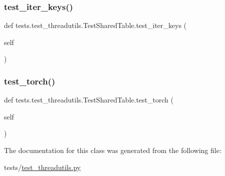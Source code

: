 \subsubsection{\texorpdfstring{test\+\_\+iter\+\_\+keys()}{test\_iter\_keys()}}
{\footnotesize\ttfamily def tests.\+test\+\_\+threadutils.\+Test\+Shared\+Table.\+test\+\_\+iter\+\_\+keys (\begin{DoxyParamCaption}\item[{}]{self }\end{DoxyParamCaption})}

\mbox{\label{classtests_1_1test__threadutils_1_1TestSharedTable_a44071985cd8526645fb0f2c41fddbff9}} 
\subsubsection{\texorpdfstring{test\+\_\+torch()}{test\_torch()}}
{\footnotesize\ttfamily def tests.\+test\+\_\+threadutils.\+Test\+Shared\+Table.\+test\+\_\+torch (\begin{DoxyParamCaption}\item[{}]{self }\end{DoxyParamCaption})}



The documentation for this class was generated from the following file\+:\begin{DoxyCompactItemize}
\item 
tests/\hyperlink{test__threadutils_8py}{test\+\_\+threadutils.\+py}\end{DoxyCompactItemize}
